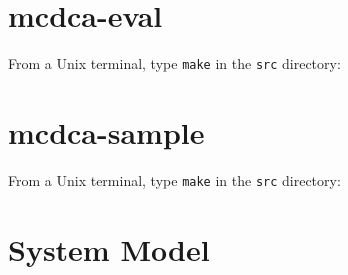 \documentclass[a4paper,onecolumn]{article}
\begin{document}
\newpage
\section{mcdca-eval}
\label{sec:mcdca-eval}
From a Unix terminal, type \verb|make| in the \verb|src| directory:

\newpage
\section{mcdca-sample}
\label{sec:mcdca-sample}
From a Unix terminal, type \verb|make| in the \verb|src| directory:

\section{System Model}
\label{sec:system-model}


\end{document}
